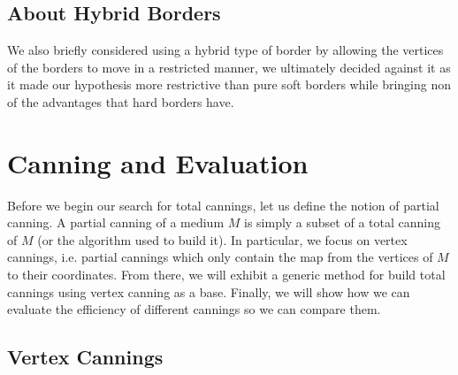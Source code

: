 \documentclass{article}
\begin{document}
\subsection{About Hybrid Borders}

We also briefly considered using a hybrid type of border by allowing the vertices of the borders to move in a restricted manner, we ultimately decided against it as it made our hypothesis more restrictive than pure soft borders while bringing non of the advantages that hard borders have.

\section{Canning and Evaluation}

Before we begin our search for total cannings, let us define the notion of partial canning. A partial canning of a medium $M$ is simply a subset of a total canning of $M$ (or the algorithm used to build it). In particular, we focus on vertex cannings, i.e. partial cannings which only contain the map from the vertices of $M$ to their coordinates. From there, we will exhibit a generic method for build total cannings using vertex canning as a base. Finally, we will show how we can evaluate the efficiency of different cannings so we can compare them.

\subsection{Vertex Cannings}
\label{partial_canning}
\end{document}
